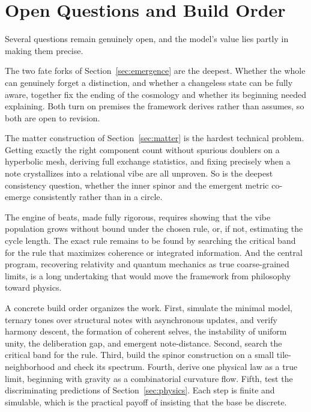 \section{Open Questions and Build Order}
\label{sec:questions}

Several questions remain genuinely open, and the model's value lies partly in making them precise.

The two fate forks of Section~\ref{sec:emergence} are the deepest. Whether the whole can genuinely forget a distinction, and whether a changeless state can be fully aware, together fix the ending of the cosmology and whether its beginning needed explaining. Both turn on premises the framework derives rather than assumes, so both are open to revision.

The matter construction of Section~\ref{sec:matter} is the hardest technical problem. Getting exactly the right component count without spurious doublers on a hyperbolic mesh, deriving full exchange statistics, and fixing precisely when a note crystallizes into a relational vibe are all unproven. So is the deepest consistency question, whether the inner spinor and the emergent metric co-emerge consistently rather than in a circle.

The engine of beats, made fully rigorous, requires showing that the vibe population grows without bound under the chosen rule, or, if not, estimating the cycle length. The exact rule remains to be found by searching the critical band for the rule that maximizes coherence or integrated information. And the central program, recovering relativity and quantum mechanics as true coarse-grained limits, is a long undertaking that would move the framework from philosophy toward physics.

A concrete build order organizes the work. First, simulate the minimal model, ternary tones over structural notes with asynchronous updates, and verify harmony descent, the formation of coherent selves, the instability of uniform unity, the deliberation gap, and emergent note-distance. Second, search the critical band for the rule. Third, build the spinor construction on a small tile-neighborhood and check its spectrum. Fourth, derive one physical law as a true limit, beginning with gravity as a combinatorial curvature flow. Fifth, test the discriminating predictions of Section~\ref{sec:physics}. Each step is finite and simulable, which is the practical payoff of insisting that the base be discrete.
